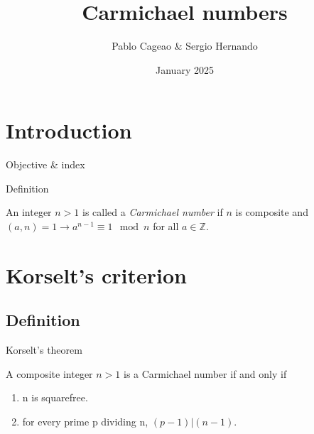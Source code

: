 \documentclass{beamer}
\title{Carmichael numbers}
\author{Pablo Cageao \& Sergio Hernando}
\date{January 2025}
\newcommand{\ZZ}{\mathbb{Z}}
\begin{document}
\maketitle

\section{Introduction}
\begin{frame}{Objective \& index}
    \tableofcontents
\end{frame}

\begin{frame}[fragile]{Definition}
    \begin{definition}
        An integer $n > 1$ is called a \textit{Carmichael number} if $n$ is composite and
$(a, n)=1 \to a^{n-1} \equiv 1 \mod{n}$ for all $a\in \ZZ$.
    \end{definition}
\end{frame}





\section{Korselt's criterion}
\subsection{Definition}
\begin{frame}{Korselt's theorem}
    \begin{theorem}
        A composite integer $n > 1$ is a Carmichael number if and only if
        \begin{enumerate}
            \item n is squarefree.
            \item for every prime p dividing n, $(p - 1) | (n - 1)$.
        \end{enumerate}
    \end{theorem}
\end{frame}

\end{document}
